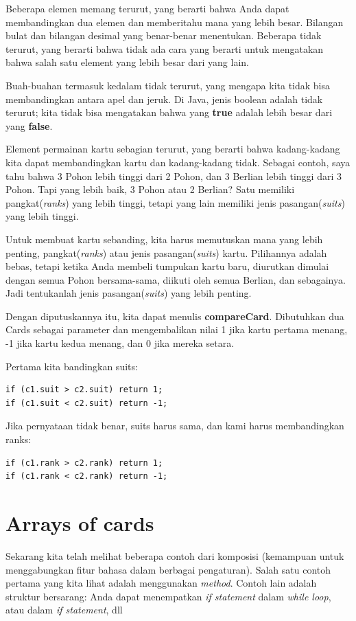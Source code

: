 \noindent Beberapa elemen memang terurut, yang berarti bahwa Anda dapat membandingkan dua elemen dan memberitahu mana yang lebih besar. Bilangan bulat dan bilangan desimal yang benar-benar menentukan. Beberapa tidak terurut, yang berarti bahwa tidak ada cara yang berarti untuk mengatakan bahwa salah satu element yang lebih besar dari yang lain. 

\noindent Buah-buahan termasuk kedalam tidak terurut, yang mengapa kita tidak bisa membandingkan antara apel dan jeruk. Di Java, jenis boolean adalah tidak terurut; kita tidak bisa mengatakan bahwa yang \textbf{true} adalah lebih besar dari yang \textbf{false}.

\noindent Element permainan kartu sebagian terurut, yang berarti bahwa kadang-kadang kita dapat membandingkan kartu dan kadang-kadang tidak. Sebagai contoh, saya tahu bahwa 3 Pohon lebih tinggi dari 2 Pohon, dan 3 Berlian lebih tinggi dari 3 Pohon. Tapi yang lebih baik, 3 Pohon atau 2 Berlian? Satu memiliki pangkat(\textit{ranks}) yang lebih tinggi, tetapi yang lain memiliki jenis pasangan(\textit{suits}) yang lebih tinggi.

\noindent Untuk membuat kartu sebanding, kita harus memutuskan mana yang lebih penting, pangkat(\textit{ranks}) atau jenis pasangan(\textit{suits}) kartu. Pilihannya adalah bebas, tetapi ketika Anda membeli tumpukan kartu baru,  diurutkan dimulai dengan semua Pohon bersama-sama, diikuti oleh semua Berlian, dan sebagainya. Jadi tentukanlah jenis pasangan(\textit{suits}) yang lebih penting.

\noindent Dengan diputuskannya itu, kita dapat menulis \textbf{compareCard}. Dibutuhkan dua Cards sebagai parameter dan mengembalikan nilai 1 jika kartu pertama menang, -1 jika kartu kedua menang, dan 0 jika mereka setara.

\noindent Pertama kita bandingkan suits: 
\begin{lstlisting}
if (c1.suit > c2.suit) return 1; 
if (c1.suit < c2.suit) return -1; 
\end{lstlisting}

\noindent Jika pernyataan tidak benar, suits harus sama, dan kami harus membandingkan ranks: 
\begin{lstlisting}
if (c1.rank > c2.rank) return 1; 
if (c1.rank < c2.rank) return -1; 
\end{lstlisting}

\section{Arrays of cards}
Sekarang kita telah melihat beberapa contoh dari komposisi (kemampuan untuk menggabungkan fitur bahasa dalam berbagai pengaturan). Salah satu contoh pertama yang kita lihat adalah menggunakan \textit{method}. Contoh lain adalah struktur bersarang: Anda dapat menempatkan \textit{if statement} dalam \textit{while loop}, atau dalam \textit{if statement}, dll

